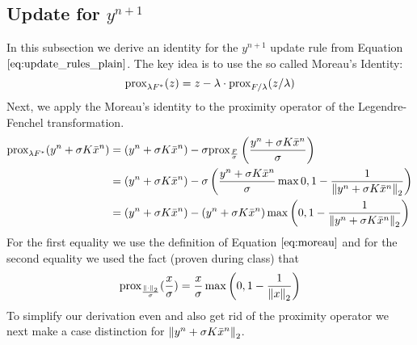 \subsection{Update for $y^{n+1}$}
In this subsection we derive an identity for the $y^{n+1}$ update rule from Equation $\ref{eq:update_rules_plain}$. The key idea is to use the so called Moreau's Identity:  
\begin{equation}
	\text{prox}_{\lambda F^*}(z) = z - \lambda \cdot \text{prox}_{F/ \lambda}(z / \lambda) 
\label{eq:moreau}	
\end{equation}
Next, we apply the Moreau's identity to the proximity operator of the Legendre-Fenchel transformation.
\begin{align}
	\text{prox}_{\lambda F^*}(y^n + \sigma K \bar{x}^{n}) 
	&= (y^n + \sigma K \bar{x}^{n}) - \sigma \text{prox}_{\frac{F}{\sigma} } \left(\frac{y^n + \sigma K \bar{x}^{n} }{\sigma} \right) \nonumber \\
	&= (y^n + \sigma K \bar{x}^{n}) - \sigma \left( \frac{y^n + \sigma K \bar{x}^{n} }{\sigma} \max{0, 1-\frac{1}{\left\lVert y^n + \sigma K \bar{x}^{n} \right\rVert_2}} \right) \nonumber \\
	&= (y^n + \sigma K \bar{x}^{n}) - \left( y^n + \sigma K \bar{x}^{n} \right) \max{\left(0, 1-\frac{1}{\left\lVert y^n + \sigma K \bar{x}^{n} \right\rVert_2}\right)}  
\label{eq:y_n_1_expression}
\end{align}
For the first equality we use the definition of Equation $\ref{eq:moreau}$ and for the second equality we used the fact (proven during class) that
\begin{align}
	\text{prox}_{\frac{\left\lVert\cdot\right\rVert_2}{\sigma}}(\frac{x}{\sigma}) = \frac{x}{\sigma} \max{\left(0, 1-\frac{1}{\left\lVert x\right\rVert_2}\right)}
\end{align}
To simplify our derivation even and also get rid of the proximity operator we next make a case distinction for $\left\lVert y^n + \sigma K \bar{x}^{n}\right\rVert_2$. 
